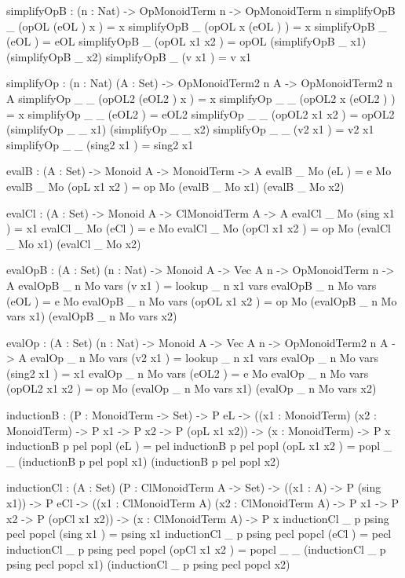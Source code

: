 \begin{togcode}     
  simplifyOpB : (n : Nat) -> OpMonoidTerm n -> OpMonoidTerm n
  simplifyOpB _ (opOL (eOL ) x ) = x
  simplifyOpB _ (opOL x (eOL ) ) = x
  simplifyOpB _ (eOL ) = eOL
  simplifyOpB _ (opOL x1 x2 ) = opOL (simplifyOpB _ x1) (simplifyOpB _ x2)
  simplifyOpB _ (v x1 ) = v x1

  simplifyOp : (n : Nat) (A : Set) -> OpMonoidTerm2 n A -> OpMonoidTerm2 n A
  simplifyOp _ _ (opOL2 (eOL2 ) x ) = x
  simplifyOp _ _ (opOL2 x (eOL2 ) ) = x
  simplifyOp _ _ (eOL2 ) = eOL2
  simplifyOp _ _ (opOL2 x1 x2 ) = opOL2 (simplifyOp _ _ x1) (simplifyOp _ _ x2)
  simplifyOp _ _ (v2 x1 ) = v2 x1
  simplifyOp _ _ (sing2 x1 ) = sing2 x1
 
  evalB : (A : Set) -> Monoid A -> MonoidTerm -> A
  evalB _ Mo (eL ) = e Mo
  evalB _ Mo (opL x1 x2 ) = op Mo (evalB _ Mo x1) (evalB _ Mo x2)
  
  evalCl : (A : Set) -> Monoid A -> ClMonoidTerm A -> A
  evalCl _ Mo (sing x1 ) = x1
  evalCl _ Mo (eCl ) = e Mo
  evalCl _ Mo (opCl x1 x2 ) = op Mo (evalCl _ Mo x1) (evalCl _ Mo x2)
  
  evalOpB : (A : Set) (n : Nat) -> Monoid A -> Vec A n -> OpMonoidTerm n -> A
  evalOpB _ n Mo vars (v x1 ) = lookup _ n x1 vars
  evalOpB _ n Mo vars (eOL ) = e Mo
  evalOpB _ n Mo vars (opOL x1 x2 ) = 
        op Mo (evalOpB _ n Mo vars x1) (evalOpB _ n Mo vars x2)
\end{togcode}
\begin{togcode}    
  evalOp : (A : Set) (n : Nat) -> Monoid A -> Vec A n -> 
                              OpMonoidTerm2 n A -> A
  evalOp _ n Mo vars (v2 x1 ) = lookup _ n x1 vars
  evalOp _ n Mo vars (sing2 x1 ) = x1
  evalOp _ n Mo vars (eOL2 ) = e Mo
  evalOp _ n Mo vars (opOL2 x1 x2 ) = 
         op Mo (evalOp _ n Mo vars x1) (evalOp _ n Mo vars x2)
 
  inductionB : (P : MonoidTerm -> Set) -> P eL -> 
               ((x1 : MonoidTerm) (x2 : MonoidTerm) -> 
                P x1 -> P x2 -> P (opL x1 x2)) -> 
               (x : MonoidTerm) -> P x
  inductionB p pel popl (eL ) = pel
  inductionB p pel popl (opL x1 x2 ) = 
         popl _ _ (inductionB p pel popl x1) (inductionB p pel popl x2)
  
  inductionCl : (A : Set) (P : ClMonoidTerm A -> Set) -> 
                ((x1 : A) -> P (sing x1)) -> P eCl -> 
                ((x1 : ClMonoidTerm A) (x2 : ClMonoidTerm A) -> 
                  P x1 -> P x2 -> P (opCl x1 x2)) -> 
                (x : ClMonoidTerm A) -> P x
  inductionCl _ p psing pecl popcl (sing x1 ) = psing x1
  inductionCl _ p psing pecl popcl (eCl ) = pecl
  inductionCl _ p psing pecl popcl (opCl x1 x2 ) = 
        popcl _ _ (inductionCl _ p psing pecl popcl x1) 
                  (inductionCl _ p psing pecl popcl x2)
\end{togcode}                  
